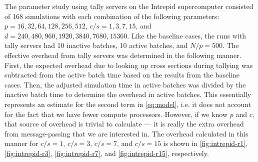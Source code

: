 The parameter study using tally servers on the Intrepid supercomputer consisted
of 168 simulations with each combination of the following parameters: $p =
16,32,64,128, \allowbreak 256,512$, $c/s = 1,3,7,15$, and $d = 240, 480, 960,
1920, 3840, 7680, 15360$. Like the baseline cases, the runs with tally servers
had 10 inactive batches, 10 active batches, and $N/p = 500$. The effective
overhead from tally servers was determined in the following manner. First, the
expected overhead due to looking up cross sections during tallying was
subtracted from the active batch time based on the results from the baseline
cases. Then, the adjusted simulation time in active batches was divided by the
inactive batch time to determine the overhead in active batches. This
essentially represents an estimate for the second term in \eqref{eq:model},
i.e. it does not account for the fact that we have fewer compute
processors. However, if we know $p$ and $c$, that source of overhead is trivial
to calculate --- it is really the extra overhead from message-passing that we
are interested in. The overhead calculated in this manner for $c/s = 1$, $c/s =
3$, $c/s = 7$, and $c/s = 15$ is shown in \autoref{fig:intrepid-r1},
\autoref{fig:intrepid-r3}, \autoref{fig:intrepid-r7}, and
\autoref{fig:intrepid-r15}, respectively.

